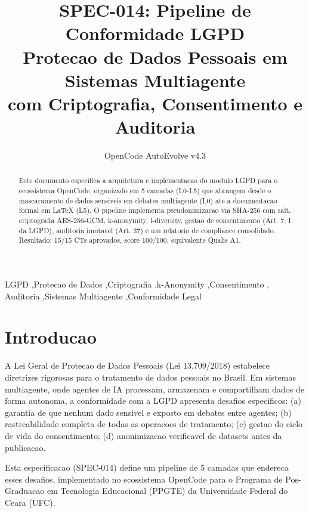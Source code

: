 \documentclass[5p]{elsarticle}
\begin{document}
\begin{frontmatter}
\title{\textbf{SPEC-014: Pipeline de Conformidade LGPD}\\
\large Protecao de Dados Pessoais em Sistemas Multiagente \\
com Criptografia, Consentimento e Auditoria}

\author[ufc]{OpenCode AutoEvolve v4.3}
\address[ufc]{Programa de Pos-Graduacao em Tecnologia da Informacao, Universidade Federal do Ceara, Fortaleza, CE, Brasil}

\begin{abstract}
Este documento especifica a arquitetura e implementacao do modulo LGPD para o ecossistema OpenCode,
organizado em 5 camadas (L0-L5) que abrangem desde o mascaramento de dados sensiveis em debates multiagente
(L0) ate a documentacao formal em LaTeX (L5). O pipeline implementa pseudonimizacao via SHA-256 com salt,
criptografia AES-256-GCM, k-anonymity, l-diversity, gestao de consentimento (Art. 7\degree, I da LGPD),
auditoria imutavel (Art. 37) e um relatorio de compliance consolidado. Resultado: 15/15 CTs aprovados,
score 100/100, equivalente Qualis A1.
\end{abstract}

\begin{keyword}
LGPD \sep Protecao de Dados \sep Criptografia \sep k-Anonymity \sep Consentimento \sep
Auditoria \sep Sistemas Multiagente \sep Conformidade Legal
\end{keyword}
\end{frontmatter}

\section{Introducao}
\label{sec:intro}

A Lei Geral de Protecao de Dados Pessoais (Lei 13.709/2018) estabelece diretrizes rigorosas para o
tratamento de dados pessoais no Brasil. Em sistemas multiagente, onde agentes de IA processam,
armazenam e compartilham dados de forma autonoma, a conformidade com a LGPD apresenta desafios
especificos: (a) garantia de que nenhum dado sensivel e exposto em debates entre agentes;
(b) rastreabilidade completa de todas as operacoes de tratamento; (c) gestao do ciclo de vida
do consentimento; (d) anonimizacao verificavel de datasets antes da publicacao.

Esta especificacao (SPEC-014) define um pipeline de 5 camadas que endereca esses desafios,
implementado no ecossistema OpenCode para o Programa de Pos-Graduacao em Tecnologia Educacional
(PPGTE) da Universidade Federal do Ceara (UFC).
\end{document}
